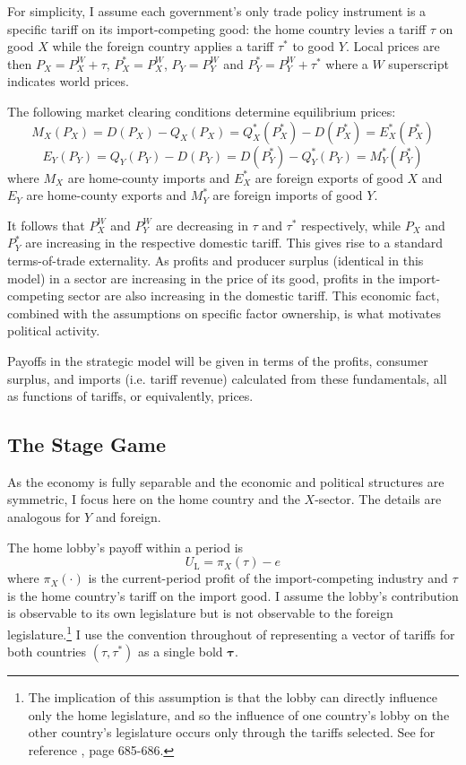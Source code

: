 \documentclass[authoryear, review]{elsarticle}
\begin{document}
For simplicity, I assume each government's only trade policy instrument is a specific tariff on its import-competing good: the home country levies a tariff $\tau$ on good $X$ while the foreign country applies a tariff $\tau^*$ to good $Y$. Local prices are then $P_X = P_X^W + \tau$, $P_X^* = P_X^W$, $P_Y = P_Y^W$ and $P_Y^* = P_Y^W + \tau^*$ where a $W$ superscript indicates world prices.

The following market clearing conditions determine equilibrium prices:
$$M_X(P_X)= D(P_X)-Q_X(P_X) = Q_X^*(P_X^*) - D(P_X^*) = E_X^*(P_X^*)$$
$$E_Y(P_Y)=Q_Y(P_Y)-D(P_Y) = D(P_Y^*)-Q_Y^*(P_Y) = M_Y^*(P_Y^*)$$
where $M_X$ are home-county imports and $E_X^*$ are foreign exports of good $X$ and $E_Y$ are home-county exports and $M_Y^*$ are foreign imports of good $Y$.

It follows that $P_X^W$ and $P_Y^W$ are decreasing in $\tau$ and $\tau^*$ respectively, while $P_X$ and $P_Y^*$ are increasing in the respective domestic tariff. This gives rise to a standard terms-of-trade externality. As profits and producer surplus (identical in this model) in a sector are increasing in the price of its good, profits in the import-competing sector are also increasing in the domestic tariff. This economic fact, combined with the assumptions on specific factor ownership, is what motivates political activity.

Payoffs in the strategic model will be given in terms of the profits, consumer surplus, and imports (i.e. tariff revenue) calculated from these fundamentals, all as functions of tariffs, or equivalently, prices.

\subsection{The Stage Game}
\label{sec:stage}
As the economy is fully separable and the economic and political structures are symmetric, I focus here on the home country and the $X$-sector. The details are analogous for $Y$ and foreign.

The home lobby's payoff within a period is
\begin{equation}
  U_\text{L} = \pi_X(\tau)-e
  \label{eq:lv3}
\end{equation}
where $\pi_X(\cdot)$ is the current-period profit of the import-competing industry and $\tau$ is the home country's tariff on the import good. I assume the lobby's contribution is observable to its own legislature but is not observable to the foreign legislature.\footnote{The implication of this assumption is that the lobby can directly influence only the home legislature, and so the influence of one country's lobby on the other country's legislature occurs only through the tariffs selected. See for reference \citet{gh95}, page 685-686.} I use the convention throughout of representing a vector of tariffs for both countries $(\tau,\tau^*)$ as a single bold $\bm{\tau}$. 
\end{document}
